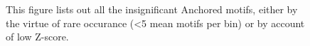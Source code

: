 \begin{figure}[htb]
    
    
    
    
    
    \caption{ This figure lists out all the insignificant Anchored motifs, either by the virtue of rare occurance (<5 mean motifs per bin) or by account of low Z-score. }
    
    \label{fig:Rare_motifs}
\end{figure}
